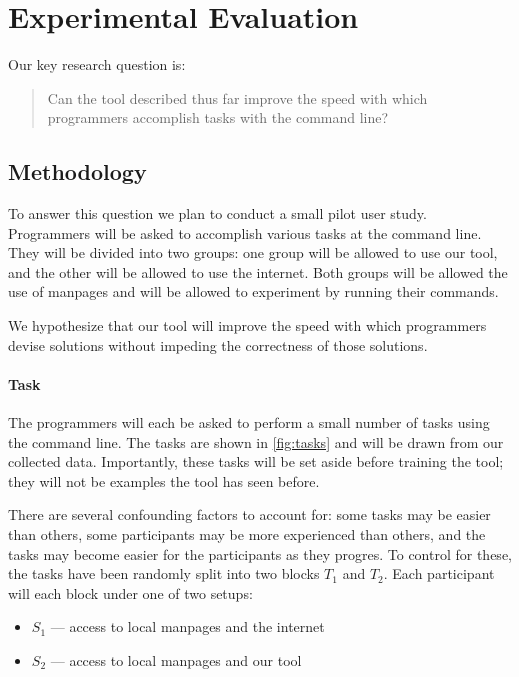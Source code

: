 \section{Experimental Evaluation}

Our key research question is:
%
\begin{quote}
    Can the tool described thus far improve the speed with which programmers
    accomplish tasks with the command line?
\end{quote}

\subsection{Methodology}
\label{subsec:methodology}

To answer this question we plan to conduct a small pilot user study. Programmers
will be asked to accomplish various tasks at the command line. They will be
divided into two groups: one group will be allowed to use our tool, and the
other will be allowed to use the internet. Both groups will be allowed the use
of manpages and will be allowed to experiment by running their commands.

We hypothesize that our tool will improve the speed with which programmers
devise solutions without impeding the correctness of those solutions.

\paragraph{Task} The programmers will each be asked to perform a small number of
tasks using the command line. The tasks are shown in \autoref{fig:tasks} and
will be drawn from our collected data. Importantly, these tasks will be set
aside before training the tool; they will not be examples the tool has seen
before.

There are several confounding factors to account for: some tasks may be easier
than others, some participants may be more experienced than others, and the
tasks may become easier for the participants as they progres. To control for
these, the tasks have been randomly split into two blocks $T_1$ and $T_2$.
Each participant will each block under one of two setups:
\begin{itemize}
    \item $S_1$ --- access to local manpages and the internet
    \item $S_2$ --- access to local manpages and our tool
\end{itemize}

